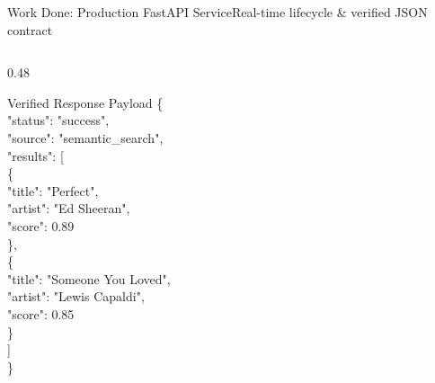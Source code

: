 \documentclass[aspectratio=169,10pt]{beamer}
\begin{document}
\begin{frame}[fragile]{Work Done: Production FastAPI Service}{Real-time lifecycle \& verified JSON contract}
\begin{columns}[T]
        \begin{column}{0.48\textwidth}
            \begin{block}{Verified Response Payload}
                \fontsize{6pt}{7.5pt}\selectfont\ttfamily
                \{\\
                \quad "status": "success",\\
                \quad "source": "semantic\_search",\\
                \quad "results": [\\
                \quad\quad \{\\
                \quad\quad\quad "title": "Perfect",\\
                \quad\quad\quad "artist": "Ed Sheeran",\\
                \quad\quad\quad "score": 0.89\\
                \quad\quad \},\\
                \quad\quad \{\\
                \quad\quad\quad "title": "Someone You Loved",\\
                \quad\quad\quad "artist": "Lewis Capaldi",\\
                \quad\quad\quad "score": 0.85\\
                \quad\quad \}\\
                \quad ]\\
                \}
            \end{block}
        \end{column}
    \end{columns}
\end{frame}
\end{document}
